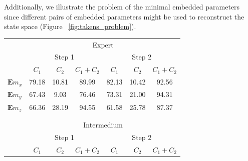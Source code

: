 \documentclass{sigchi}
\begin{document}
Additionally, we illustrate the problem of the minimal embedded parameters since 
different pairs of embedded parameters might be used to reconstruct the state space (Figure ~\ref{fig:takens_problem}). 



\begin{table}
\tiny
\centering
\begin{tabular}{l c c c c c c }
\toprule

& \multicolumn{6}{c}{Expert} \\
\cmidrule(r){2-7}

& \multicolumn{3}{c}{Step 1} & \multicolumn{3}{c}{Step 2}\\
\cmidrule(lr){2-4} \cmidrule(lr){5-7}

     & $C_1$  & $C_2$  & $C_1+C_2$  & $C_1$  & $C_2$  & $C_1+C_2$  \\
\midrule

$\boldsymbol{E} m_{x}$ & 79.18 & 10.81 & 89.99 & 82.13 & 10.42 & 92.56 \\
$\boldsymbol{E} m_{y}$ & 67.43 & 9.03 & 76.46 & 73.31 & 21.00 & \cellcolor{blue!25}94.31 \\
$\boldsymbol{E} m_{z}$ & 66.36 & 28.19 & \cellcolor{blue!25}94.55 & 61.58 & 25.78 & 87.37   \\

\\
\\
& \multicolumn{6}{c}{Intermedium} \\
\cmidrule(r){2-7}

& \multicolumn{3}{c}{Step 1} & \multicolumn{3}{c}{Step 2}\\
\cmidrule(lr){2-4} \cmidrule(lr){5-7}
     & $C_1$  & $C_2$  & $C_1+C_2$  & $C_1$  & $C_2$  & $C_1+C_2$  \\
\midrule


\end{tabular}
\end{table}
\end{document}
